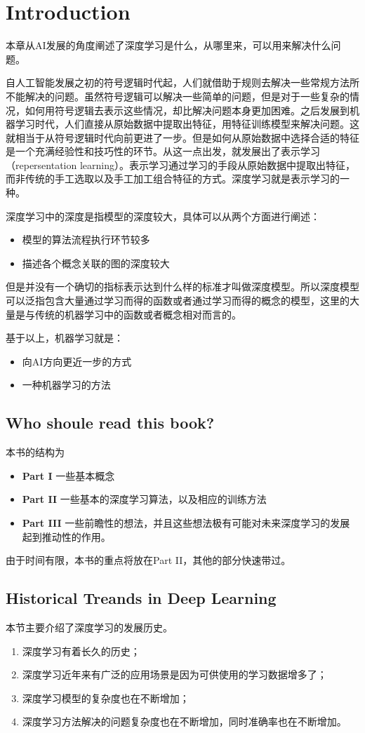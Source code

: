 \chapter{Introduction}


本章从AI发展的角度阐述了深度学习是什么，从哪里来，可以用来解决什么问题。

自人工智能发展之初的符号逻辑时代起，人们就借助于规则去解决一些常规方法所不能解决的问题。虽然符号逻辑可以解决一些简单的问题，但是对于一些复杂的情况，如何用符号逻辑去表示这些情况，却比解决问题本身更加困难。之后发展到机器学习时代，人们直接从原始数据中提取出特征，用特征训练模型来解决问题。这就相当于从符号逻辑时代向前更进了一步。但是如何从原始数据中选择合适的特征是一个充满经验性和技巧性的环节。从这一点出发，就发展出了表示学习（repersentation learning）。表示学习通过学习的手段从原始数据中提取出特征，而非传统的手工选取以及手工加工组合特征的方式。深度学习就是表示学习的一种。

深度学习中的深度是指模型的深度较大，具体可以从两个方面进行阐述：
\begin{itemize}
\item 模型的算法流程执行环节较多
\item 描述各个概念关联的图的深度较大
\end{itemize}

但是并没有一个确切的指标表示达到什么样的标准才叫做深度模型。所以深度模型可以泛指包含大量通过学习而得的函数或者通过学习而得的概念的模型，这里的大量是与传统的机器学习中的函数或者概念相对而言的。

基于以上，机器学习就是：
\begin{itemize}
\item 向AI方向更近一步的方式
\item 一种机器学习的方法
\end{itemize}

\section{Who shoule read this book?}

本书的结构为

\begin{itemize}
\item \textbf{Part I} 一些基本概念
\item \textbf{Part II} 一些基本的深度学习算法，以及相应的训练方法
\item \textbf{Part III} 一些前瞻性的想法，并且这些想法极有可能对未来深度学习的发展起到推动性的作用。
\end{itemize}

由于时间有限，本书的重点将放在Part II，其他的部分快速带过。

\section{Historical Treands in Deep Learning}

本节主要介绍了深度学习的发展历史。
\begin{enumerate}
\item 深度学习有着长久的历史；
\item 深度学习近年来有广泛的应用场景是因为可供使用的学习数据增多了；
\item 深度学习模型的复杂度也在不断增加；
\item 深度学习方法解决的问题复杂度也在不断增加，同时准确率也在不断增加。
\end{enumerate}